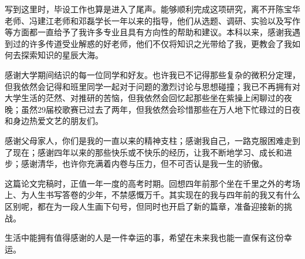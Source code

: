 
\begin{acknowledgements}
	
写到这里时，毕设工作也算是进入了尾声。能够顺利完成这项研究，离不开陈宝华老师、冯建江老师和邓磊学长一年以来的指导，他们从选题、调研、实验以及写作等方面都一直给予了我许多专业且具有方向性的帮助和建议。本科以来，感谢我遇到过的许多传道受业解惑的好老师，他们不仅将知识之光带给了我，更教会了我如何去探索知识的星辰大海。

感谢大学期间结识的每一位同学和好友。也许我已不记得那些复杂的微积分定理，但我依然会记得和班里同学一起对于问题的激烈讨论与思想碰撞；我已不再拥有对大学生活的茫然、对推研的苦恼，但我依然会回忆起那些坐在紫操上闲聊过的夜晚；虽然29届校歌赛已过去了两年，但我依然会珍惜那些在万人地下忙碌过的日夜和身边热爱文艺的朋友们。

感谢父母家人，你们是我的一直以来的精神支柱；感谢我自己，一路克服困难走到了现在；感谢四年以来的那些快乐或不快乐的经历，让我不断地学习、成长和进步；感谢清华，也许你充满着内卷与压力，但不可否认是我一生的骄傲。

这篇论文完稿时，正值一年一度的高考时期。回想四年前那个坐在千里之外的考场上、为人生书写答卷的少年，不禁感慨万千。其实现在的我与四年前的我又有什么区别呢，都在为一段人生画下句号，但同时也开启了新的篇章，准备迎接新的挑战。

生活中能拥有值得感谢的人是一件幸运的事，希望在未来我也能一直保有这份幸运。
	
\end{acknowledgements}
